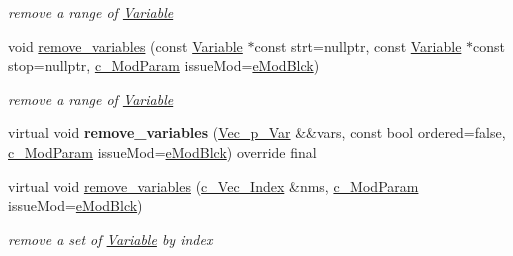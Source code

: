 \begin{Indent}
\begin{DoxyCompactItemize}
\begin{DoxyCompactList}\small\item\em remove a range of \mbox{\hyperlink{class_s_m_spp__di__unipi__it_1_1_variable}{Variable}} \end{DoxyCompactList}\item 
void \mbox{\hyperlink{class_s_m_spp__di__unipi__it_1_1_linear_function_ac13e2e93fa68c8f1ac8212bb3f518530}{remove\+\_\+variables}} (const \mbox{\hyperlink{class_s_m_spp__di__unipi__it_1_1_variable}{Variable}} $\ast$const strt=nullptr, const \mbox{\hyperlink{class_s_m_spp__di__unipi__it_1_1_variable}{Variable}} $\ast$const stop=nullptr, \mbox{\hyperlink{group___modification___t_y_p_e_s_ga544246d8c462e9a2d817c2c30797968f}{c\+\_\+\+Mod\+Param}} issue\+Mod=\mbox{\hyperlink{group___modification___t_y_p_e_s_gga48fddcdd03a03f49b7e389ca1ed938d4a21b14b26b1c0093a0905f6fc010bad29}{e\+Mod\+Blck}})
\begin{DoxyCompactList}\small\item\em remove a range of \mbox{\hyperlink{class_s_m_spp__di__unipi__it_1_1_variable}{Variable}} \end{DoxyCompactList}\item 
\mbox{\label{class_s_m_spp__di__unipi__it_1_1_linear_function_a27a99e6bdf1661521b09196b944d8d8f}} 
virtual void {\bfseries remove\+\_\+variables} (\mbox{\hyperlink{group___variable___t_y_p_e_s_ga8e4a4bbc570f38e6eea262bc19e2a583}{Vec\+\_\+p\+\_\+\+Var}} \&\&vars, const bool ordered=false, \mbox{\hyperlink{group___modification___t_y_p_e_s_ga544246d8c462e9a2d817c2c30797968f}{c\+\_\+\+Mod\+Param}} issue\+Mod=\mbox{\hyperlink{group___modification___t_y_p_e_s_gga48fddcdd03a03f49b7e389ca1ed938d4a21b14b26b1c0093a0905f6fc010bad29}{e\+Mod\+Blck}}) override final
\item 
virtual void \mbox{\hyperlink{class_s_m_spp__di__unipi__it_1_1_linear_function_a504a08a9d99543bc0740e4a2352e1e27}{remove\+\_\+variables}} (\mbox{\hyperlink{group___thin_var_dep_interface___c_l_a_s_s_e_s_ga03461123d4f6090aefeb97ef653d3f2b}{c\+\_\+\+Vec\+\_\+\+Index}} \&nms, \mbox{\hyperlink{group___modification___t_y_p_e_s_ga544246d8c462e9a2d817c2c30797968f}{c\+\_\+\+Mod\+Param}} issue\+Mod=\mbox{\hyperlink{group___modification___t_y_p_e_s_gga48fddcdd03a03f49b7e389ca1ed938d4a21b14b26b1c0093a0905f6fc010bad29}{e\+Mod\+Blck}})
\begin{DoxyCompactList}\small\item\em remove a set of \mbox{\hyperlink{class_s_m_spp__di__unipi__it_1_1_variable}{Variable}} by index \end{DoxyCompactList}\end{DoxyCompactItemize}
\end{Indent}
